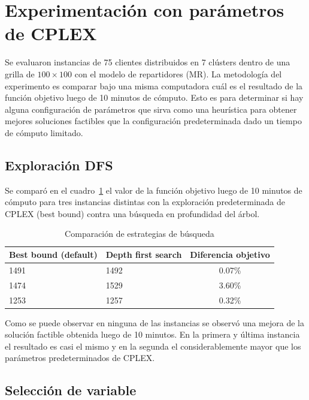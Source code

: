 \documentclass[10pt]{article}
\begin{document}
\clearpage

\section{Experimentación con parámetros de CPLEX}

Se evaluaron instancias de 75 clientes distribuidos en 7 clústers dentro de una grilla de $100 \times 100$ con el modelo de repartidores (MR). La metodología del experimento es comparar bajo una misma computadora cuál es el resultado de la función objetivo luego de 10 minutos de cómputo. Esto es para determinar si hay alguna configuración de parámetros que sirva como una heurística para obtener mejores soluciones factibles que la configuración predeterminada dado un tiempo de cómputo limitado.

\subsection{Exploración DFS}

Se comparó en el cuadro~\ref{tab:comparacion_busqueda_dfs} el valor de la función objetivo luego de 10 minutos de cómputo para tres instancias distintas con la exploración predeterminada de CPLEX (best bound) contra una búsqueda en profundidad del árbol.

\begin{table}[htbp]
	\centering
	\begin{tabular}{llc}
		\hline
		\textbf{Best bound (default)} & \textbf{Depth first search} & \textbf{Diferencia objetivo} \\
		\hline
		1491 & 1492 & 0.07\% \\
		1474 & 1529 & 3.60\% \\
		1253 & 1257 & 0.32\% \\
		\hline
	\end{tabular}
	\caption{Comparación de estrategias de búsqueda}
	\label{tab:comparacion_busqueda_dfs}
\end{table}

Como se puede observar en ninguna de las instancias se observó una mejora de la solución factible obtenida luego de 10 minutos. En la primera y última instancia el resultado es casi el mismo y en la segunda el considerablemente mayor que los parámetros predeterminados de CPLEX.

\subsection{Selección de variable}
\end{document}

